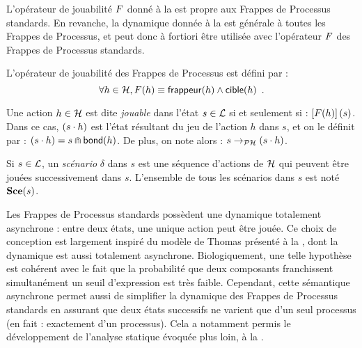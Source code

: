 
L'opérateur de jouabilité $F$ donné à la  est propre aux
Frappes de Processus standards.
En revanche, la dynamique donnée à la  est générale à toutes les
Frappes de Processus, et peut donc à fortiori être utilisée avec l'opérateur $F$
des Frappes de Processus standards.

\begin{definition}
  L'opérateur de jouabilité des Frappes de Processus est défini par :
  \[\forall h \in \mathcal{H}, F(h) \equiv \mathsf{frappeur}(h) \wedge \mathsf{cible}(h) \enspace.\]
\end{definition}

\begin{definition}
  Une action $h \in \mathcal{H}$ est dite \emph{jouable}
  dans l'état $s \in \mathcal{L}$ si et seulement si :
  $\left[F(h)\right](s)$.
  Dans ce cas, $(s \cdot h)$ est l'état résultant du jeu de l'action $h$ dans $s$,
  et on le définit par : $(s \cdot h) = s \Cap \mathsf{bond}(h)$.
  De plus, on note alors : $s \rightarrow_{\mathcal{PH}} (s \cdot h)$.

  Si $s \in \mathcal{L}$, un \emph{scénario} $\delta$ dans $s$
  est une séquence d'actions de $\mathcal{H}$ qui peuvent être jouées successivement dans $s$.
  L'ensemble de tous les scénarios dans $s$ est noté $\mathbf{Sce}(s)$.
\end{definition}



\begin{remark}
  Les Frappes de Processus standards possèdent une dynamique totalement asynchrone :
  entre deux états, une unique action peut être jouée.
  Ce choix de conception est largement inspiré du modèle de Thomas
  présenté à la ,
  dont la dynamique est aussi totalement asynchrone.
  Biologiquement, une telle hypothèse est cohérent avec le fait que la probabilité
  que deux composants franchissent simultanément un seuil d'expression est très faible.
  Cependant, cette sémantique asynchrone permet aussi de simplifier la dynamique des
  Frappes de Processus standards en assurant que deux états successifs ne varient
  que d'un seul processus (en fait : exactement d'un processus).
  Cela a notamment permis le développement de l'analyse statique évoquée
  plus loin, à la .
\end{remark}




